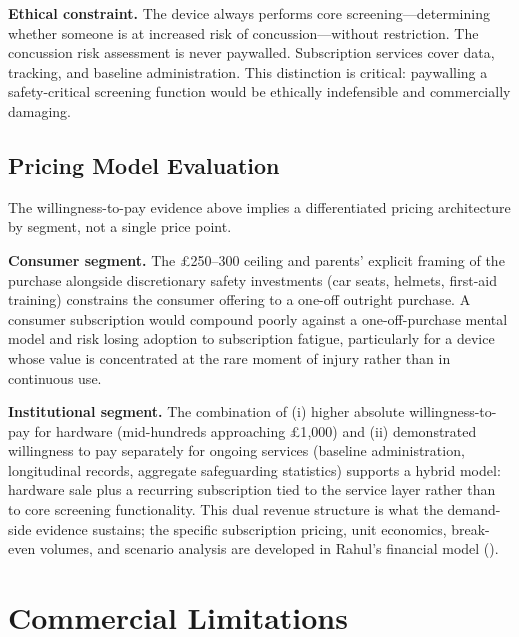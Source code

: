 \textbf{Ethical constraint.} The device always performs core screening---determining whether someone is at increased risk of concussion---without restriction. The concussion risk assessment is never paywalled. Subscription services cover data, tracking, and baseline administration. This distinction is critical: paywalling a safety-critical screening function would be ethically indefensible and commercially damaging.


\subsection{Pricing Model Evaluation}
\label{sec:ent-pricing-model}

The willingness-to-pay evidence above implies a differentiated pricing architecture by segment, not a single price point.

\textbf{Consumer segment.} The \pounds 250--300 ceiling and parents' explicit framing of the purchase alongside discretionary safety investments (car seats, helmets, first-aid training) constrains the consumer offering to a one-off outright purchase. A consumer subscription would compound poorly against a one-off-purchase mental model and risk losing adoption to subscription fatigue, particularly for a device whose value is concentrated at the rare moment of injury rather than in continuous use.

\textbf{Institutional segment.} The combination of (i) higher absolute willingness-to-pay for hardware (mid-hundreds approaching \pounds 1{,}000) and (ii) demonstrated willingness to pay separately for ongoing services (baseline administration, longitudinal records, aggregate safeguarding statistics) supports a hybrid model: hardware sale plus a recurring subscription tied to the service layer rather than to core screening functionality. This dual revenue structure is what the demand-side evidence sustains; the specific subscription pricing, unit economics, break-even volumes, and scenario analysis are developed in Rahul's financial model ().


\section{Commercial Limitations}
\label{sec:ent-commercial-limitations}

